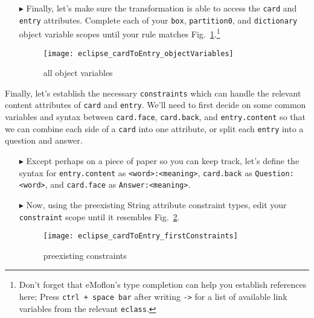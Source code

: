 \begin{itemize}
\item[$\blacktriangleright$] Finally, let's make sure the transformation is able to access the \texttt{card} and \texttt{entry} attributes. Complete each
of your \texttt{box}, \texttt{partition0}, and \texttt{dictionary} object variable scopes until your rule matches Fig.~\ref{fig:c2eAllReferences}.\footnote{Don't
forget that eMoflon's type completion can help you establish references here; Press \texttt{ctrl + space bar} after writing \texttt{->} for a list of available
link variables from the relevant \texttt{eclass}.}

\newpage

\begin{figure}[htb]
\begin{center}
  \texttt{[image: eclipse\_cardToEntry\_objectVariables]}
  \caption{all object variables}
  \label{fig:c2eAllReferences}
\end{center}
\end{figure}

\end{itemize}

Finally, let's establish the necessary \texttt{constraints} which can handle the relevant content attributes of \texttt{card} and \texttt{entry}. We'll need to
first decide on some common variables and syntax between \texttt{card.face}, \texttt{card.back}, and \texttt{entry.content} so that we can combine each side of
a \texttt{card} into one attribute, or split each \texttt{entry} into a question and answer. 

\begin{itemize}

\item[$\blacktriangleright$] Except perhaps on a piece of paper so you can keep track, let's define the syntax for \texttt{entry.content} as
\texttt{<word>:<meaning>}, \texttt{card.back} as \texttt{Question:<word>}, and \texttt{card.face} as \texttt{Answer:<meaning>}. 

\vspace{0.5cm}

\item[$\blacktriangleright$] Now, using the preexisting String attribute constraint types, edit your \texttt{constraint} scope until it resembles
Fig.~\ref{fig:contentConstraints}.

\begin{figure}[htbp]
\begin{center}
  \texttt{[image: eclipse\_cardToEntry\_firstConstraints]}
  \caption{preexisting constraints}
  \label{fig:contentConstraints}
\end{center}
\end{figure}

\end{itemize}

